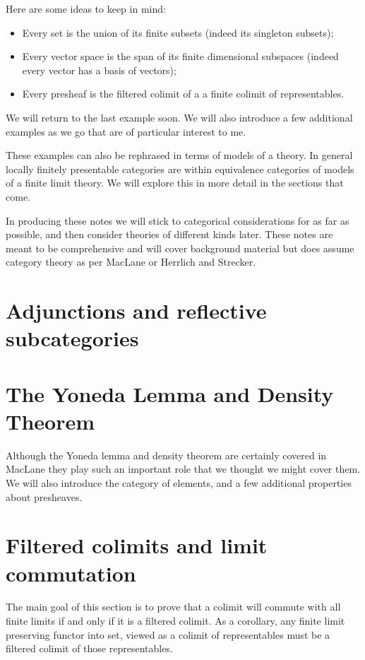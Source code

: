 \documentclass{article}
\newcommand{\<}{\left\langle}
\renewcommand{\>}{\right\rangle}
\begin{document}
Here are some ideas to keep in mind:
\begin{itemize}
    \item Every set is the union of its finite subsets (indeed its singleton subsets);
    \item Every vector space is the span of its finite dimensional subspaces (indeed every vector has a basis of vectors);
    \item Every presheaf is the filtered colimit of a a finite colimit of representables.
\end{itemize}
We will return to the last example soon.  We will also introduce a few additional 
examples as we go that are of particular interest to me.

These examples can also be rephrased 
in terms of models of a theory.  In general locally finitely presentable 
categories are within equivalence categories of models of a finite limit 
theory.  We will explore this in more detail in the sections that come.

In producing these notes we will stick to categorical considerations for as 
far as possible, and then consider theories of different kinds later.  These 
notes are meant to be comprehensive and will cover background material but 
does assume category theory as per MacLane or Herrlich and Strecker.

\section{Adjunctions and reflective subcategories}

\section{The Yoneda Lemma and Density Theorem}
Although the Yoneda lemma and density theorem are certainly covered in 
MacLane they play such an important role that we thought we might cover them.
We will also introduce the category of elements, and a few additional properties 
about presheaves.

\section{Filtered colimits and limit commutation}
The main goal of this section is to prove that a colimit will commute 
with all finite limits if and only if it is a filtered colimit.  As a 
corollary, any finite limit preserving functor into set, viewed as a colimit 
of representables must be a filtered colimit of those representables.
\end{document}
